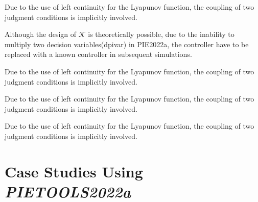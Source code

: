 \documentclass[twocolumn]{autart}    %
\begin{document}
\begin{rmk}
    Due to the use of left continuity for the Lyapunov function, the coupling of two judgment conditions is implicitly involved.
\end{rmk}

\begin{rmk}
    Although the design of $\mathcal{K}$ is theoretically possible, due to the inability to multiply two decision variables(dpivar) in PIE2022a, 
    the controller have to be replaced with a known controller in subsequent simulations.    %
\end{rmk}

\begin{rmk}
    Due to the use of left continuity for the Lyapunov function, the coupling of two judgment conditions is implicitly involved.
\end{rmk}

\begin{rmk}
    Due to the use of left continuity for the Lyapunov function, the coupling of two judgment conditions is implicitly involved.
\end{rmk}

\begin{rmk}
    Due to the use of left continuity for the Lyapunov function, the coupling of two judgment conditions is implicitly involved.
\end{rmk}


\section{Case Studies Using \emph{PIETOOLS2022a}}
\end{document}
